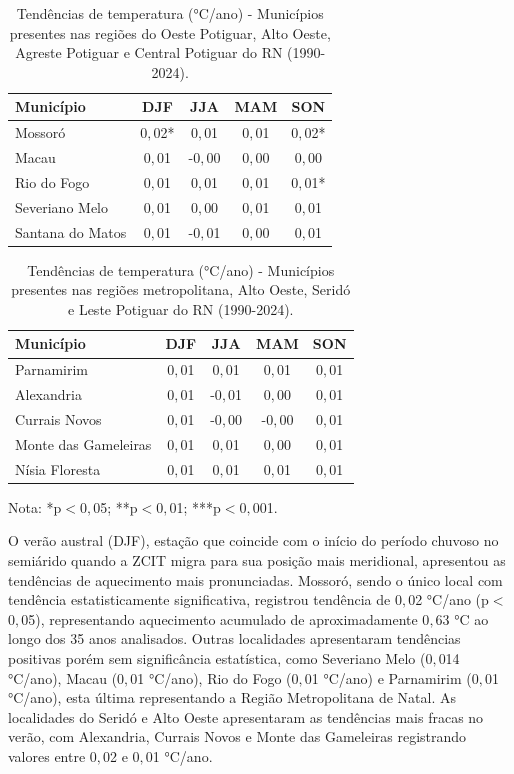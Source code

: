 \begin{table}[H]
	\centering
	\caption{Tendências de temperatura (°C/ano) - Municípios presentes nas regiões do Oeste Potiguar, Alto Oeste, Agreste Potiguar e Central Potiguar do RN (1990-2024).}
	\label{tab:tendencias_temp_rn_a}
	\small
	\begin{tabular}{lcccc}
		\hline
		\textbf{Município} & \textbf{DJF} & \textbf{JJA} & \textbf{MAM} & \textbf{SON} \\
		\hline
		Mossoró  & 0${,}$02*& 0${,}$01& 0${,}$01& 0${,}$02*\\
		Macau& 0${,}$01& -0${,}$00& 0${,}$00& 0${,}$00\\
		Rio do Fogo & 0${,}$01& 0${,}$01& 0${,}$01& 0${,}$01*\\
		Severiano Melo & 0${,}$01& 0${,}$00& 0${,}$01& 0${,}$01\\
		Santana do Matos & 0${,}$01& -0${,}$01& 0${,}$00& 0${,}$01\\
		\hline
	\end{tabular}
\end{table}

\begin{table}[H]
	\centering
	\caption{Tendências de temperatura (°C/ano) - Municípios presentes nas regiões metropolitana, Alto Oeste, Seridó e Leste Potiguar do RN (1990-2024).}
	\label{tab:tendencias_temp_rn_b}
	\small
	\begin{tabular}{lcccc}
		\hline
		\textbf{Município} & \textbf{DJF} & \textbf{JJA} & \textbf{MAM} & \textbf{SON} \\
		\hline
		Parnamirim & 0${,}$01& 0${,}$01 & 0${,}$01& 0${,}$01\\
		Alexandria & 0${,}$01& -0${,}$01& 0${,}$00& 0${,}$01\\
		Currais Novos & 0${,}$01& -0${,}$00& -0${,}$00& 0${,}$01\\
		Monte das Gameleiras & 0${,}$01& 0${,}$01& 0${,}$00& 0${,}$01\\
		Nísia Floresta & 0${,}$01& 0${,}$01& 0${,}$01& 0${,}$01\\
		\hline
	\end{tabular}
	\vspace{2mm}
	
	{\footnotesize Nota: *p$<$0${,}$05; **p$<$0${,}$01; ***p$<$0${,}$001.}
\end{table}

O verão austral (DJF), estação que coincide com o início do período chuvoso no semiárido quando a ZCIT migra para sua posição mais meridional, apresentou as tendências de aquecimento mais pronunciadas. Mossoró, sendo o único local com tendência estatisticamente significativa, registrou tendência de 0${,}$02 °C/ano (p$<$0${,}$05), representando aquecimento acumulado de aproximadamente 0${,}$63 °C ao longo dos 35 anos analisados. Outras localidades apresentaram tendências positivas porém sem significância estatística, como Severiano Melo (0${,}$014 °C/ano), Macau (0${,}$01 °C/ano), Rio do Fogo (0${,}$01 °C/ano) e Parnamirim (0${,}$01 °C/ano), esta última representando a Região Metropolitana de Natal. As localidades do Seridó e Alto Oeste apresentaram as tendências mais fracas no verão, com Alexandria, Currais Novos e Monte das Gameleiras registrando valores entre 0${,}$02 e 0${,}$01 °C/ano.

